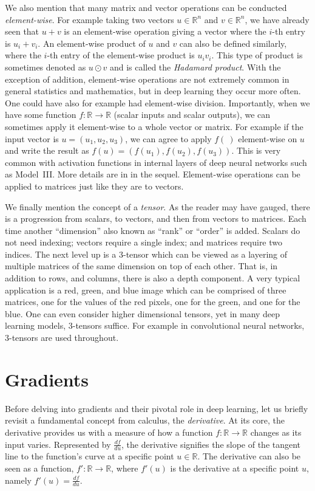 \documentclass[12pt]{article}
\begin{document}
We also mention that many matrix and vector operations can be conducted {\em element-wise}. For example taking two vectors $u \in {\mathbb R}^n$ and $v \in {\mathbb R}^n$, we have already seen that $u+v$ is an element-wise operation giving a vector where the $i$-th entry is $u_i+v_i$. An element-wise product of $u$ and $v$ can also be defined similarly, where the $i$-th entry of the element-wise product is $u_i v_i$. This type of product is sometimes denoted as $u \odot v$ and is called the {\em Hadamard product}. With the exception of addition, element-wise operations are not extremely common in general statistics and mathematics, but in deep learning they occur more often. One could have also for example had element-wise division. Importantly, when we have some function $f: {\mathbb R} \to {\mathbb R}$ (scalar inputs and scalar outputs), we can sometimes apply it element-wise to a whole vector or matrix. For example if the input vector is $u = (u_1, u_2, u_3)$, we can agree to apply $f(~)$ element-wise on $u$ and write the result as $f(u) = (f(u_1), f(u_2), f(u_3))$. This is very common with activation functions in internal layers of deep neural networks such as Model~III. More details are in in the sequel. Element-wise operations can be applied to matrices just like they are to vectors.

We finally mention the concept of a {\em tensor}. As the reader may have gauged, there is a progression from scalars, to vectors, and then from vectors to matrices. Each time another ``dimension'' also known as ``rank'' or ``order'' is added. Scalars do not need indexing; vectors require a single index; and matrices require two indices. The next level up is a $3$-tensor which can be viewed as a layering of multiple matrices of the same dimension on top of each other. That is, in addition to rows, and columns, there is also a depth component. A very typical application is a red, green, and blue image which can be comprised of three matrices, one for the values of the red pixels, one for the green, and one for the blue. One can even consider higher dimensional tensors, yet in many deep learning models, $3$-tensors suffice. For example in convolutional neural networks, $3$-tensors are used throughout.

\section{Gradients}
\label{sec:gradient}
Before delving into gradients and their pivotal role in deep learning, let us briefly revisit a fundamental concept from calculus, the {\em derivative}. At its core, the derivative provides us with a measure of how a function $f: {\mathbb R} \to {\mathbb R}$ changes as its input varies. Represented by \( \frac{df}{du} \), the derivative signifies the slope of the tangent line to the function's curve at a specific point $u \in {\mathbb R}$. The derivative can also be seen as a function, $f':{\mathbb R} \to {\mathbb R}$, where $f'(u)$ is the derivative at a specific point $u$, namely $f'(u) = \frac{df}{du}$.  
\end{document}
